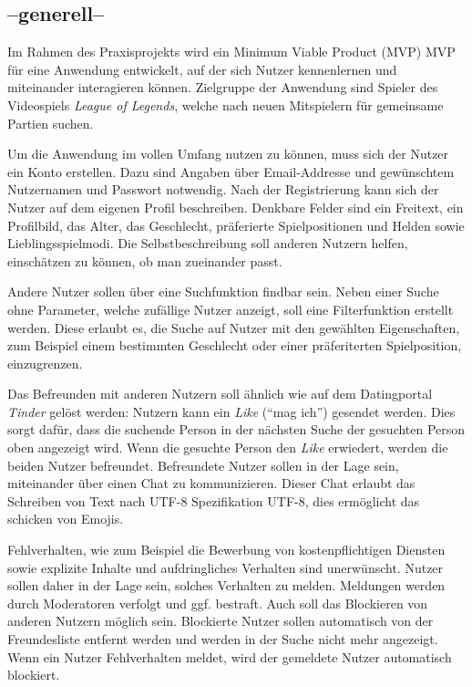 \subsection{--generell--}
Im Rahmen des Praxisprojekts wird ein Minimum Viable Product
(MVP) \gls{MVP}
für eine Anwendung entwickelt, auf der sich Nutzer kennenlernen und miteinander interagieren können. Zielgruppe der Anwendung sind Spieler des Videospiels \textit{League of Legends}, welche nach neuen Mitspielern für gemeinsame Partien suchen.

Um die Anwendung im vollen Umfang nutzen zu können, muss sich der Nutzer ein Konto erstellen.
Dazu sind Angaben über Email-Addresse und gewünschtem Nutzernamen und Passwort notwendig.
Nach der Registrierung kann sich der Nutzer auf dem eigenen Profil beschreiben.
Denkbare Felder sind ein Freitext, ein Profilbild, das Alter, das Geschlecht, präferierte Spielpositionen und Helden sowie Lieblingsspielmodi.
Die Selbstbeschreibung soll anderen Nutzern helfen, einschätzen zu können, ob man zueinander passt.

Andere Nutzer sollen über eine Suchfunktion findbar sein.
Neben einer Suche ohne Parameter, welche zufällige Nutzer anzeigt, soll eine Filterfunktion erstellt werden.
Diese erlaubt es, die Suche auf Nutzer mit den gewählten Eigenschaften, zum Beispiel einem bestimmten Geschlecht oder einer präferiterten Spielposition, einzugrenzen.

Das Befreunden mit anderen Nutzern soll ähnlich wie auf dem Datingportal \textit{Tinder} gelöst werden: Nutzern kann ein \textit{Like} (\enquote{mag ich}) gesendet werden.
Dies sorgt dafür, dass die suchende Person in der nächsten Suche der gesuchten Person oben angezeigt wird.
Wenn die gesuchte Person den \textit{Like} erwiedert, werden die beiden Nutzer befreundet.
Befreundete Nutzer sollen in der Lage sein, miteinander über einen Chat zu kommunizieren.
Dieser Chat erlaubt das Schreiben von Text nach UTF-8 Spezifikation \gls{UTF-8},
dies ermöglicht das schicken von Emojis.

Fehlverhalten, wie zum Beispiel die Bewerbung von kostenpflichtigen Diensten sowie explizite Inhalte und aufdringliches Verhalten sind unerwünscht.
Nutzer sollen daher in der Lage sein, solches Verhalten zu melden.
Meldungen werden durch Moderatoren verfolgt und ggf. bestraft.
Auch soll das Blockieren von anderen Nutzern möglich sein.
Blockierte Nutzer sollen automatisch von der Freundesliste entfernt werden und werden in der Suche nicht mehr angezeigt.
Wenn ein Nutzer Fehlverhalten meldet, wird der gemeldete Nutzer automatisch blockiert.

